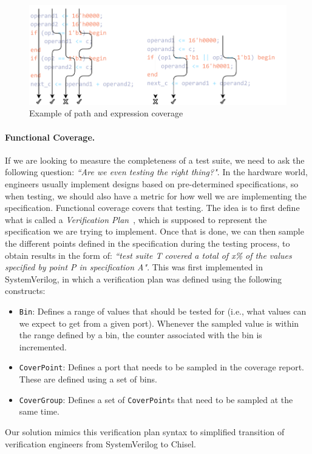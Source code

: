 \documentclass[runningheads]{llncs}
\begin{document}
\begin{figure}
    \centering
    \includegraphics[width=\textwidth]{Coverage_example.pdf}
    \caption{Example of path and expression coverage}
\label{fig:expr}
\end{figure}

\paragraph{Functional Coverage.} If we are looking to measure the completeness of a test suite, we need to ask the following question: \textit{``Are we even testing the right thing?"}. In the hardware world, engineers usually implement designs based on pre-determined specifications, so when testing, we should also have a metric for how well we are implementing the specification. Functional coverage covers that testing. The idea is to first define what is called a \textit{Verification Plan}~\cite{spear2008systemverilog}, which is supposed to represent the specification we are trying to implement. Once that is done, we can then sample the different points defined in the specification during the testing process, to obtain results in the form of: \textit{``test suite T covered a total of x\% of the values specified by point P in specification A"}. This was first implemented in SystemVerilog, in which a verification plan was defined using the following constructs:  
\begin{itemize}
\item \texttt{Bin}: Defines a range of values that should be tested for (i.e., what values can we expect to get from a given port). Whenever the sampled value is within the range defined by a bin, the counter associated with the bin is incremented.
\item \texttt{CoverPoint}: Defines a port that needs to be sampled in the coverage report. These are defined using a set of bins.
\item \texttt{CoverGroup}: Defines a set of \texttt{CoverPoint}s that need to be sampled at the same time.
\end{itemize}
Our solution mimics this verification plan syntax to simplified transition of verification engineers from SystemVerilog to Chisel.
\end{document}
